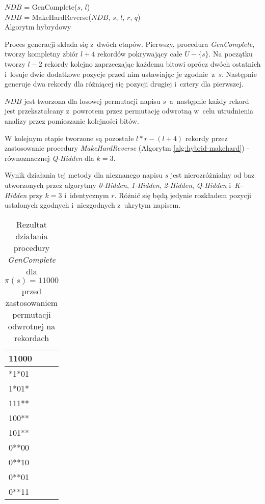 \begin{algorithm}[!htb]
    \SetAlgoLined
   
    $NDB$ = GenComplete($s$, $l$)\\
    $NDB$ = MakeHardReverse($NDB$, $s$, $l$, $r$, $q$)\\
    \caption{Algorytm hybrydowy}
    \label{alg:hybrid}
\end{algorithm}

Proces generacji składa się z~dwóch etapów. Pierwszy, procedura \textit{GenComplete}, tworzy kompletny zbiór $l + 4$ rekordów pokrywający
całe $U - \{s\}$. Na początku tworzy $l-2$ rekordy kolejno zaprzeczając każdemu bitowi oprócz dwóch ostatnich
i~losuje dwie dodatkowe pozycje przed nim ustawiając je zgodnie~z~$s$.
Następnie generuje dwa rekordy dla różniącej się pozycji drugiej i~cztery dla pierwszej.

$NDB$ jest tworzona dla losowej permutacji napisu $s$~a~następnie każdy rekord 
jest przekształcany z~powrotem przez permutację odwrotną w~celu utrudnienia analizy przez pomieszanie kolejności bitów.

W kolejnym etapie tworzone są pozostałe $l*r - (l+4)$ rekordy przez zastosowanie procedury \textit{MakeHardReverse} (Algorytm \ref{alg:hybrid-makehard}) - równoznacznej
\textit{Q-Hidden} dla $k=3$. 

Wynik działania tej metody dla nieznanego napisu $s$ jest nierozróżnialny od baz utworzonych przez algorytmy \textit{0-Hidden}, \textit{1-Hidden},
\textit{2-Hidden}, \textit{Q-Hidden} i~\textit{K-Hidden} przy $k = 3$ i~identycznym $r$. Różnić się będą jedynie rozkładem pozycji
ustalonych zgodnych i~niezgodnych z~ukrytym napisem.

\begin{table}[!tb]
    \centering
    \begin{tabular}{|l|}
    	\hline
    	\textbf{11000} \\ \hline
    	*1*01          \\
    	1*01*          \\
    	111**          \\
    	100**          \\
    	101**          \\
    	0**00          \\
    	0**10          \\
    	0**01          \\
    	0**11          \\ \hline
    \end{tabular}
    \caption{Rezultat działania procedury \textit{GenComplete} dla $\pi(s) = 11000$ przed zastosowaniem permutacji odwrotnej na rekordach}
    \label{tbl:gencomplete_results}
\end{table}


